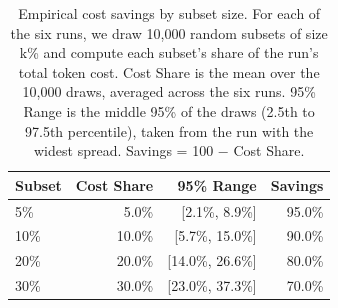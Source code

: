 \begin{table}[t]
\centering
\caption{Empirical cost savings by subset size. For each of the six runs, we draw 10,000 random subsets of size k\% and compute each subset's share of the run's total token cost. Cost Share is the mean over the 10,000 draws, averaged across the six runs. 95\% Range is the middle 95\% of the draws (2.5th to 97.5th percentile), taken from the run with the widest spread. Savings = 100 $-$ Cost Share.}
\label{tab:rq4-savings}
\begin{tabular}{lrrr}
\toprule
Subset & Cost Share & 95\% Range & Savings \\
\midrule
5\% & 5.0\% & [2.1\%, 8.9\%] & 95.0\% \\
10\% & 10.0\% & [5.7\%, 15.0\%] & 90.0\% \\
20\% & 20.0\% & [14.0\%, 26.6\%] & 80.0\% \\
30\% & 30.0\% & [23.0\%, 37.3\%] & 70.0\% \\
\bottomrule
\end{tabular}
\end{table}
